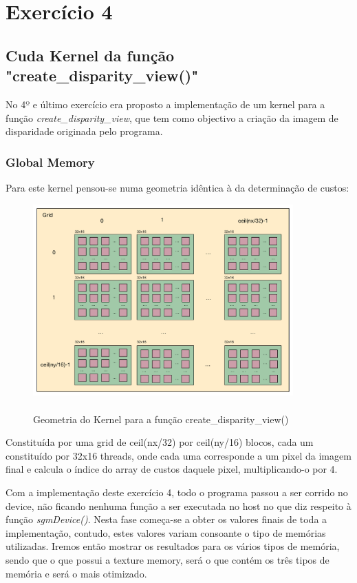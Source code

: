 \documentclass[pdftex,12pt,a4paper]{report}
\begin{document}
\newpage
\section{Exercício 4}

\subsection{Cuda Kernel da função "create\_disparity\_view()"}

No 4º e último exercício era proposto a implementação de um kernel para a função \textit{create\_disparity\_view}, que tem como objectivo a criação da imagem de disparidade originada pelo programa.

\subsubsection{Global Memory}
Para este kernel pensou-se numa geometria idêntica à da determinação de custos:

\begin{figure}[!htb]
\center
 \includegraphics[width=100mm,scale=1]{DetermineCosts_v1_kernel.pdf}
 \caption{\\ Geometria do Kernel para a função create\_disparity\_view()}
 \label{fig:create_v1_kernel}
\end{figure}

Constituída por uma grid de ceil(nx/32) por ceil(ny/16) blocos, cada um constituído por 32x16 threads, onde cada uma corresponde a um pixel da imagem final e calcula o índice do array de custos daquele pixel, multiplicando-o por 4.

Com a implementação deste exercício 4, todo o programa passou a ser corrido no device, não ficando nenhuma função a ser executada no host no que diz respeito à função \textit{sgmDevice()}. Nesta fase começa-se a obter os valores finais de toda a implementação, contudo, estes valores variam consoante o tipo de memórias utilizadas. Iremos então mostrar os resultados para os vários tipos de memória, sendo que o que possui a texture memory, será o que contém os três tipos de memória e será o mais otimizado.
\end{document}
